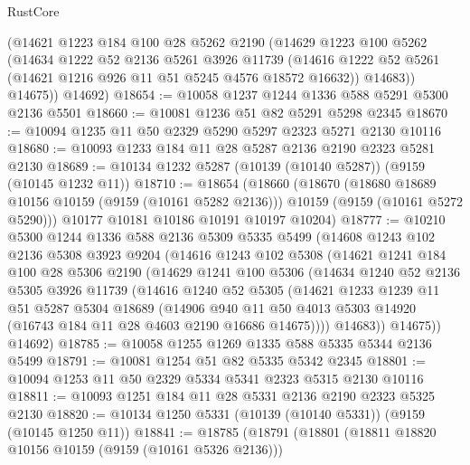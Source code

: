 \begin{lexlean}{RustCore}
\begin{coremodule}
        (@14621
          @1223
          @184
          @100
          @28
          @5262
          @2190
          (@14629
            @1223
            @100
            @5262
            (@14634
              @1222
              @52
              @2136
              @5261
              @3926
              @11739
              (@14616 @1222 @52 @5261 (@14621 @1216 @926 @11 @51 @5245 @4576 @18572 @16632))
              @14683))
          @14675))
      @14692)
@18654 := @10058 @1237 @1244 @1336 @588 @5291 @5300 @2136 @5501
@18660 := @10081 @1236 @51 @82 @5291 @5298 @2345
@18670 := @10094 @1235 @11 @50 @2329 @5290 @5297 @2323 @5271 @2130 @10116
@18680 := @10093 @1233 @184 @11 @28 @5287 @2136 @2190 @2323 @5281 @2130
@18689 := @10134 @1232 @5287 (@10139 (@10140 @5287)) (@9159 (@10145 @1232 @11))
@18710 := @18654
    (@18660
      (@18670
        (@18680 @18689 @10156 @10159 (@9159 (@10161 @5282 @2136)))
        @10159
        (@9159 (@10161 @5272 @5290)))
      @10177
      @10181
      @10186
      @10191
      @10197
      @10204)
@18777 := @10210
    @5300
    @1244
    @1336
    @588
    @2136
    @5309
    @5335
    @5499
    (@14608
      @1243
      @102
      @2136
      @5308
      @3923
      @9204
      (@14616
        @1243
        @102
        @5308
        (@14621
          @1241
          @184
          @100
          @28
          @5306
          @2190
          (@14629
            @1241
            @100
            @5306
            (@14634
              @1240
              @52
              @2136
              @5305
              @3926
              @11739
              (@14616
                @1240
                @52
                @5305
                (@14621
                  @1233
                  @1239
                  @11
                  @51
                  @5287
                  @5304
                  @18689
                  (@14906
                    @940
                    @11
                    @50
                    @4013
                    @5303
                    @14920
                    (@16743 @184 @11 @28 @4603 @2190 @16686 @14675))))
              @14683))
          @14675))
      @14692)
@18785 := @10058 @1255 @1269 @1335 @588 @5335 @5344 @2136 @5499
@18791 := @10081 @1254 @51 @82 @5335 @5342 @2345
@18801 := @10094 @1253 @11 @50 @2329 @5334 @5341 @2323 @5315 @2130 @10116
@18811 := @10093 @1251 @184 @11 @28 @5331 @2136 @2190 @2323 @5325 @2130
@18820 := @10134 @1250 @5331 (@10139 (@10140 @5331)) (@9159 (@10145 @1250 @11))
@18841 := @18785
    (@18791
      (@18801
        (@18811 @18820 @10156 @10159 (@9159 (@10161 @5326 @2136)))

\end{coremodule}
\end{lexlean}
